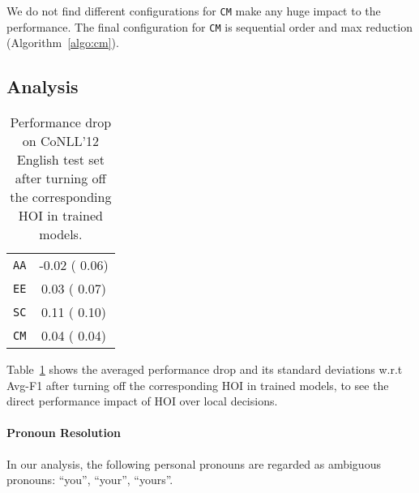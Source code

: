 \documentclass[11pt,a4paper]{article}
\newcommand\AAA{\texttt{AA}}  \newcommand\EE{\texttt{EE}}
\newcommand\SC{\texttt{SC}}
\newcommand\CM{\texttt{CM}}
\begin{document}
We do not find different configurations for \texttt{CM} make any huge impact to the performance. The final configuration for \texttt{CM} is sequential order and max reduction (Algorithm~\ref{algo:cm}).


\subsection{Analysis}
\label{append:analysis}

\begin{table}[htbp!]
\centering
\begin{tabular}{c|c}
\toprule
\AAA & -0.02 ( 0.06) \\
\EE & 0.03 ( 0.07) \\
\SC & 0.11 ( 0.10) \\
\CM & 0.04 ( 0.04) \\
\bottomrule
\end{tabular}
\caption{Performance drop on CoNLL'12 English test set after turning off the corresponding HOI in trained models.}
\label{table:impact}
\end{table}

Table~\ref{table:impact} shows the averaged performance drop and its standard deviations w.r.t Avg-F1 after turning off the corresponding HOI in trained models, to see the direct performance impact of HOI over local decisions.

\paragraph{Pronoun Resolution}

In our analysis, the following personal pronouns are regarded as ambiguous pronouns: ``you'', ``your'', ``yours''.

 
\end{document}
